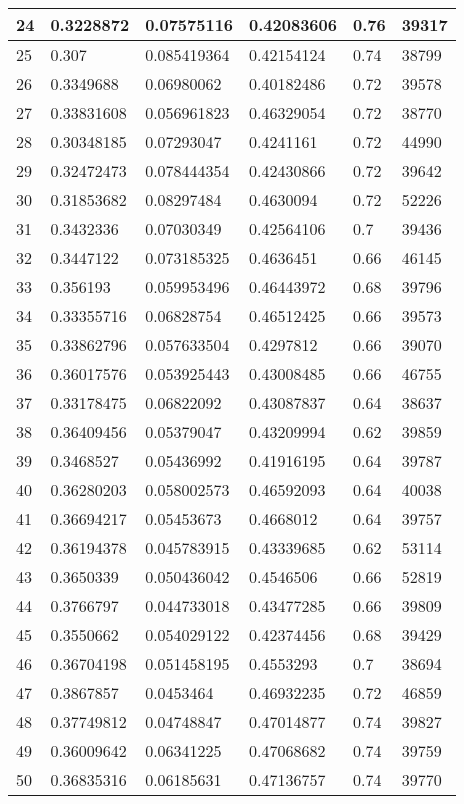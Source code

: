 \begin{longtable}{|l|l|l|l|l|l|}
24 & 0.3228872 & 0.07575116 & 0.42083606 & 0.76 & 39317 \\ \hline 
25 & 0.307 & 0.085419364 & 0.42154124 & 0.74 & 38799 \\ \hline 
26 & 0.3349688 & 0.06980062 & 0.40182486 & 0.72 & 39578 \\ \hline 
27 & 0.33831608 & 0.056961823 & 0.46329054 & 0.72 & 38770 \\ \hline 
28 & 0.30348185 & 0.07293047 & 0.4241161 & 0.72 & 44990 \\ \hline 
29 & 0.32472473 & 0.078444354 & 0.42430866 & 0.72 & 39642 \\ \hline 
30 & 0.31853682 & 0.08297484 & 0.4630094 & 0.72 & 52226 \\ \hline 
31 & 0.3432336 & 0.07030349 & 0.42564106 & 0.7 & 39436 \\ \hline 
32 & 0.3447122 & 0.073185325 & 0.4636451 & 0.66 & 46145 \\ \hline 
33 & 0.356193 & 0.059953496 & 0.46443972 & 0.68 & 39796 \\ \hline 
34 & 0.33355716 & 0.06828754 & 0.46512425 & 0.66 & 39573 \\ \hline 
35 & 0.33862796 & 0.057633504 & 0.4297812 & 0.66 & 39070 \\ \hline 
36 & 0.36017576 & 0.053925443 & 0.43008485 & 0.66 & 46755 \\ \hline 
37 & 0.33178475 & 0.06822092 & 0.43087837 & 0.64 & 38637 \\ \hline 
38 & 0.36409456 & 0.05379047 & 0.43209994 & 0.62 & 39859 \\ \hline 
39 & 0.3468527 & 0.05436992 & 0.41916195 & 0.64 & 39787 \\ \hline 
40 & 0.36280203 & 0.058002573 & 0.46592093 & 0.64 & 40038 \\ \hline 
41 & 0.36694217 & 0.05453673 & 0.4668012 & 0.64 & 39757 \\ \hline 
42 & 0.36194378 & 0.045783915 & 0.43339685 & 0.62 & 53114 \\ \hline 
43 & 0.3650339 & 0.050436042 & 0.4546506 & 0.66 & 52819 \\ \hline 
44 & 0.3766797 & 0.044733018 & 0.43477285 & 0.66 & 39809 \\ \hline 
45 & 0.3550662 & 0.054029122 & 0.42374456 & 0.68 & 39429 \\ \hline 
46 & 0.36704198 & 0.051458195 & 0.4553293 & 0.7 & 38694 \\ \hline 
47 & 0.3867857 & 0.0453464 & 0.46932235 & 0.72 & 46859 \\ \hline 
48 & 0.37749812 & 0.04748847 & 0.47014877 & 0.74 & 39827 \\ \hline 
49 & 0.36009642 & 0.06341225 & 0.47068682 & 0.74 & 39759 \\ \hline 
50 & 0.36835316 & 0.06185631 & 0.47136757 & 0.74 & 39770 \\ \hline 
\end{longtable}